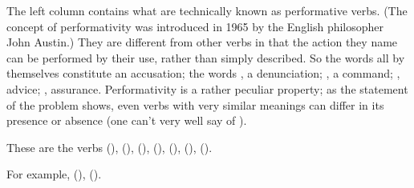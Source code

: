 \solution
%
\assignment
%
The left column contains what are technically known as performative verbs.
(The concept of performativity was introduced in 1965 by the English philosopher John Austin.) 
They are different from other verbs in that
the action they name can be performed by their use, rather than simply described.
So the words 
all by themselves constitute an accusation;
the words , a denunciation;
, a command;
, advice;
, assurance.
Performativity is a rather peculiar property;
as the statement of the problem shows,
even verbs with very similar meanings can differ in its presence or absence
(one can't very well say 
of ).

\assignment
%
These are the verbs  (),
 (),
 (),
 (),
 (),
 (),
 ().

\assignment For example,
 (),
 ().

\editrans

